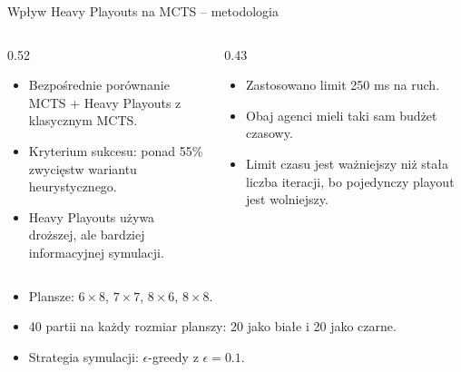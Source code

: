 \documentclass[10pt, aspectratio=169]{beamer}
\begin{document}
\begin{frame}{Wpływ Heavy Playouts na MCTS -- metodologia}
    \begin{columns}[T]
    \begin{column}{0.52\textwidth}
        \vspace{0.1cm}
        \begin{itemize}
            \item Bezpośrednie porównanie MCTS + Heavy Playouts z klasycznym MCTS.
            \item Kryterium sukcesu: ponad 55\% zwycięstw wariantu heurystycznego.
            \item Heavy Playouts używa droższej, ale bardziej informacyjnej symulacji.
        \end{itemize}
    \end{column}

    \begin{column}{0.43\textwidth}
        \vspace{0.1cm}
        \begin{itemize}
            \item Zastosowano limit 250 ms na ruch.
            \item Obaj agenci mieli taki sam budżet czasowy.
            \item Limit czasu jest ważniejszy niż stała liczba iteracji, bo pojedynczy playout jest wolniejszy.
        \end{itemize}
    \end{column}
    \end{columns}

    \vspace{0.35cm}

    \begin{itemize}
        \item Plansze: $6 \times 8$, $7 \times 7$, $8 \times 6$, $8 \times 8$.
        \item 40 partii na każdy rozmiar planszy: 20 jako białe i 20 jako czarne.
        \item Strategia symulacji: $\epsilon$-greedy z $\epsilon = 0.1$.
    \end{itemize}
\end{frame}
\end{document}
